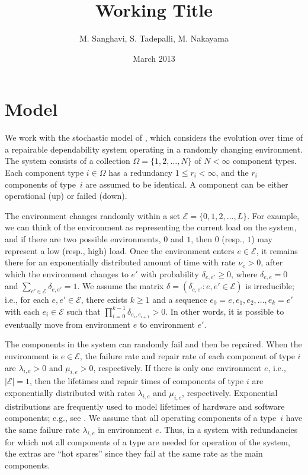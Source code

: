 \documentclass[12pt]{article}
\author{M. Sanghavi, S. Tadepalli, M. Nakayama}
\date{March 2013}
\begin{document}
\title{Working Title}
\maketitle

\section{Model}
\label{sec:model}

We work with the stochastic model of \cite{ING:2009}, which considers the evolution over time of a repairable dependability system operating in a randomly changing environment. The system consists of a collection $\Omega = \{ 1, 2, \ldots, N \}$ of $N < \infty$ component types. Each component type $i \in \Omega$ has a redundancy $1 \leq r_i < \infty$, and the $r_i$ components of type~$i$ are assumed to be identical. A component can be either operational (up) or failed (down).

The environment changes randomly within a set $\mathcal{E} = \{ 0, 1, 2, \ldots, L \}$. For example, we can think of the environment as representing the current load on the system, and if there are two possible environments, $0$ and $1$, then $0$ (resp., $1$) may represent a low (resp., high) load. Once the environment enters $e \in \mathcal{E}$, it remains there for an exponentially distributed amount of time with rate $\nu_e > 0$, after which the environment changes to $e'$ with probability $\delta_{e, e'} \geq 0$, where $\delta_{e, e} = 0$ and $\sum_{e' \in \mathcal{E}} \delta_{e, e'} = 1$. We assume the matrix $\delta = (\delta_{e, e'} : e, e' \in \mathcal{E})$ is irreducible; i.e., for each $e, e' \in \mathcal{E}$, there exists $k \geq 1$ and a sequence $e_0 = e, e_1, e_2, \ldots, e_k = e'$ with each $e_i \in \mathcal{E}$ such that $\prod_{i = 0}^{k-1} \delta_{e_i, e_{i + 1}} > 0$. In other words, it is possible to eventually move from environment $e$ to environment $e'$.

The components in the system can randomly fail and then be repaired. When the environment is $e \in \mathcal{E}$, the failure rate and repair rate of each component of type $i$ are $\lambda_{i, e} > 0$ and $\mu_{i, e} > 0$, respectively.  If there is only one environment $e$, i.e., $| \mathcal{E} | = 1$, then the lifetimes and repair times of components of type $i$ are exponentially distributed with rates $\lambda_{i, e}$ and $\mu_{i, e}$, respectively. Exponential distributions are frequently used to model lifetimes of hardware and software components; e.g., see \cite{XDP:2004}. We assume that all operating components of a type~$i$ have the same failure rate $\lambda_{i, e}$ in environment $e$. Thus, in a system with  redundancies for which not all components of a type are needed for operation of the system, the extras are ``hot spares'' since they fail at the same rate as the main components.
\end{document}
